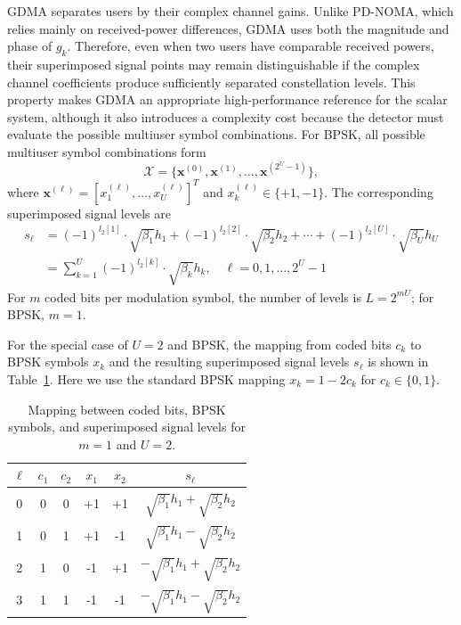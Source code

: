 GDMA separates users by their complex channel gains. Unlike PD-NOMA, which relies mainly on received-power differences, GDMA uses both the magnitude and phase of $g_k$. Therefore, even when two users have comparable received powers, their superimposed signal points may remain distinguishable if the complex channel coefficients produce sufficiently separated constellation levels. This property makes GDMA an appropriate high-performance reference for the scalar system, although it also introduces a complexity cost because the detector must evaluate the possible multiuser symbol combinations. For BPSK, all possible multiuser symbol combinations form
\begin{equation}
    \mathcal{X}=\{\bm{x}^{(0)},\bm{x}^{(1)},\ldots,\bm{x}^{(2^U-1)}\},
\end{equation}
where $\bm{x}^{(\ell)}=[x_1^{(\ell)},\ldots,x_U^{(\ell)}]^T$ and $x_k^{(\ell)}\in\{+1,-1\}$. The corresponding superimposed signal levels are
\begin{equation}
  \begin{split}
    s_\ell &= (-1)^{l_2[1]} \cdot \sqrt{\beta_1}h_1 + (-1)^{l_2[2]} \cdot \sqrt{\beta_2}h_2 + \cdots + (-1)^{l_2[U]} \cdot \sqrt{\beta_U}h_U \\
    &= \sum_{k=1}^{U} (-1)^{l_2[k]} \cdot \sqrt{\beta_k}h_k, \quad \ell=0,1,\ldots,2^U-1
  \end{split}
\end{equation}
For $m$ coded bits per modulation symbol, the number of levels is $L=2^{mU}$; for BPSK, $m=1$.

For the special case of $U=2$ and BPSK, the mapping from coded bits $c_k$ to BPSK symbols $x_k$ and the resulting superimposed signal levels $s_{\ell}$ is shown in Table~\ref{tab:superimposed-signal-m1-u2}. Here we use the standard BPSK mapping $x_k = 1-2c_k$ for $c_k\in\{0,1\}$.

\begin{table}[htbp]
  \centering
  \caption{Mapping between coded bits, BPSK symbols, and superimposed signal levels for $m=1$ and $U=2$.}
  \label{tab:superimposed-signal-m1-u2}
  \begin{tabular}{|c|c|c|c|c|c|}
    \hline
    $\ell$ & $c_1$ & $c_2$ & $x_1$ & $x_2$ & $s_\ell$ \\ \hline
    0 & 0 & 0 & +1 & +1 & $\sqrt{\beta_1}h_1 + \sqrt{\beta_2}h_2$ \\ \hline
    1 & 0 & 1 & +1 & -1 & $\sqrt{\beta_1}h_1 - \sqrt{\beta_2}h_2$ \\ \hline
    2 & 1 & 0 & -1 & +1 & $-\sqrt{\beta_1}h_1 + \sqrt{\beta_2}h_2$ \\ \hline
    3 & 1 & 1 & -1 & -1 & $-\sqrt{\beta_1}h_1 - \sqrt{\beta_2}h_2$ \\ \hline
  \end{tabular}
\end{table}

